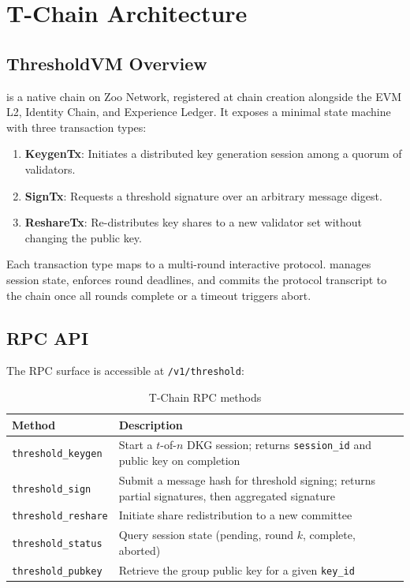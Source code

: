 \section{T-Chain Architecture}

\label{sec:architecture}

\subsection{ThresholdVM Overview}

\ThresholdVM{} is a native chain on Zoo Network, registered at chain creation alongside the EVM L2, Identity Chain, and Experience Ledger. It exposes a minimal state machine with three transaction types:

\begin{enumerate}
\item \textbf{KeygenTx}: Initiates a distributed key generation session among a quorum of validators.
\item \textbf{SignTx}: Requests a threshold signature over an arbitrary message digest.
\item \textbf{ReshareTx}: Re-distributes key shares to a new validator set without changing the public key.
\end{enumerate}

Each transaction type maps to a multi-round interactive protocol. \ThresholdVM{} manages session state, enforces round deadlines, and commits the protocol transcript to the chain once all rounds complete or a timeout triggers abort.

\subsection{RPC API}

The \TChain{} RPC surface is accessible at \texttt{/v1/threshold}:

\begin{table}[h]
\centering
\begin{tabular}{lp{7cm}}
\toprule
\textbf{Method} & \textbf{Description} \\
\midrule
\texttt{threshold\_keygen} & Start a $t$-of-$n$ DKG session; returns \texttt{session\_id} and public key on completion \\
\texttt{threshold\_sign} & Submit a message hash for threshold signing; returns partial signatures, then aggregated signature \\
\texttt{threshold\_reshare} & Initiate share redistribution to a new committee \\
\texttt{threshold\_status} & Query session state (pending, round $k$, complete, aborted) \\
\texttt{threshold\_pubkey} & Retrieve the group public key for a given \texttt{key\_id} \\
\bottomrule
\end{tabular}
\caption{T-Chain RPC methods}
\label{tab:rpc}
\end{table}

